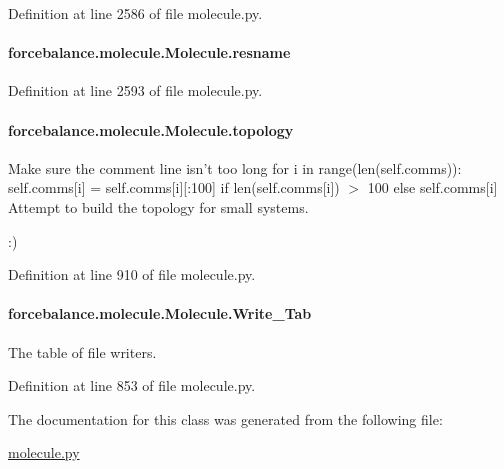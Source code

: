 Definition at line 2586 of file molecule.\-py.

\hypertarget{classforcebalance_1_1molecule_1_1Molecule_ac1def400d819601483ddf475f1389a8d}{
\paragraph[{resname}]{\setlength{\rightskip}{0pt plus 5cm}forcebalance.\-molecule.\-Molecule.\-resname}}\label{classforcebalance_1_1molecule_1_1Molecule_ac1def400d819601483ddf475f1389a8d}


Definition at line 2593 of file molecule.\-py.

\hypertarget{classforcebalance_1_1molecule_1_1Molecule_a57facdb1b7e71fabfad0df72a7ff94f5}{
\paragraph[{topology}]{\setlength{\rightskip}{0pt plus 5cm}forcebalance.\-molecule.\-Molecule.\-topology}}\label{classforcebalance_1_1molecule_1_1Molecule_a57facdb1b7e71fabfad0df72a7ff94f5}


Make sure the comment line isn't too long for i in range(len(self.\-comms))\-: self.\-comms\mbox{[}i\mbox{]} = self.\-comms\mbox{[}i\mbox{]}\mbox{[}\-:100\mbox{]} if len(self.\-comms\mbox{[}i\mbox{]}) $>$ 100 else self.\-comms\mbox{[}i\mbox{]} Attempt to build the topology for small systems. 

\-:) 

Definition at line 910 of file molecule.\-py.

\hypertarget{classforcebalance_1_1molecule_1_1Molecule_a85310a28c678cb386f9d2b584b24320d}{
\paragraph[{Write\-\_\-\-Tab}]{\setlength{\rightskip}{0pt plus 5cm}forcebalance.\-molecule.\-Molecule.\-Write\-\_\-\-Tab}}\label{classforcebalance_1_1molecule_1_1Molecule_a85310a28c678cb386f9d2b584b24320d}


The table of file writers. 



Definition at line 853 of file molecule.\-py.



The documentation for this class was generated from the following file\-:\begin{DoxyCompactItemize}
\item 
\hyperlink{molecule_8py}{molecule.\-py}\end{DoxyCompactItemize}
